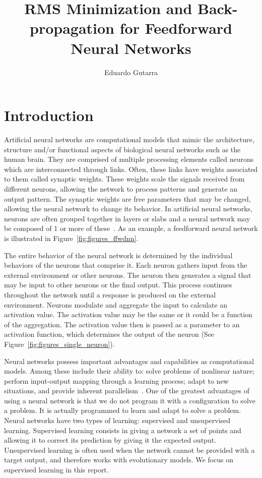 \documentclass[11pt]{article}
\title{RMS Minimization and Back-propagation for Feedforward Neural Networks}
\author{Eduardo Gutarra}
\begin{document}
	
\ifpdf
{}
\else
{}
\fi
	
\maketitle
	
\section{Introduction} %
\label{sec:introduction}

Artificial neural networks are computational models that mimic the architecture, structure and/or functional aspects of biological
neural networks such as the human brain. They are comprised of multiple processing elements called neurons which are interconnected
through links. Often, these links have weights associated to them called synaptic weights. These weights scale the signals received from
different neurons, allowing the network to process patterns and generate an output pattern. The synaptic weights are free parameters
that may be changed, allowing the neural network to change its behavior. In artificial neural networks, neurons are often grouped
together in layers or slabs and a neural network may be composed of 1 or more of these~\cite{skapura, Haykin:1994:NNC:541500}. As an
example, a feedforward neural network is illustrated in Figure~\ref{fig:figures_ffwdnn}.

The entire behavior of the neural network is determined by the individual behaviors of the neurons that comprise it. Each neuron gathers
input from the external environment or other neurons. The neuron then generates a signal that may be input to other neurons or the final
output. This process continues throughout the network until a response is produced on the external environment. Neurons modulate and
aggregate the input to calculate an activation value. The activation value may be the same or it could be a function of the aggregation.
The activation value then is passed as a parameter to an activation function, which determines the output of the neuron (See
Figure~\ref{fig:figures_single_neuron}).

Neural networks possess important advantages and capabilities as computational models. Among these include their ability to: solve
problems of nonlinear nature; perform input-output mapping through a learning process; adapt to new situations, and provide inherent
parallelism~\cite{Haykin:1994:NNC:541500}. One of the greatest advantages of using a neural network is that we do not program it with a
configuration to solve a problem. It is actually programmed to learn and adapt to solve a problem. Neural networks have two types of
learning: supervised and unsupervised learning. Supervised learning consists in giving a network a set of points and allowing it to
correct its prediction by giving it the expected output. Unsupervised learning is often used when the network cannot be provided with a
target output, and therefore works with evolutionary models. We focus on supervised learning in this report.
\end{document}
